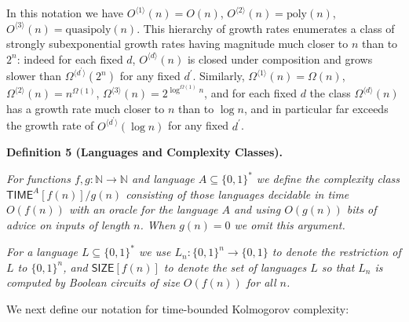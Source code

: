 


In this notation we have $O^{\langle 1\rangle}(n)=O(n)$, $O^{\langle 2\rangle}(n)=\mathrm{poly}(n)$, $O^{\langle 3\rangle}(n)=\mathrm{quasipoly}(n)$. This hierarchy of growth rates enumerates a class of strongly subexponential growth rates having magnitude much closer to $n$ than to $2^{n}$: indeed for each fixed $d$, $O^{\langle d\rangle}(n)$ is closed under composition and grows slower than $\Omega^{\langle d^{\prime}\rangle}(2^{n})$ for any fixed $d^{\prime}$.
Similarly, $\Omega^{\langle 1\rangle}(n)=\Omega(n)$, $\Omega^{\langle 2\rangle}(n)=n^{\Omega(1)}$, $\Omega^{\langle 3\rangle}(n)=2^{\log^{\Omega(1)}n}$, and for each fixed $d$ the class $\Omega^{\langle d\rangle}(n)$ has a growth rate much closer to $n$ than to $\log n$, and in particular far exceeds the growth rate of $O^{\langle d^{\prime}\rangle}(\log n)$ for any fixed $d^{\prime}$.\par





\par\medskip\noindent\textbf{
\textbf{Definition 5}\textbf{ }(Languages and Complexity Classes)\textbf{.}
}\par



\emph{For functions $f,g:\mathbb{N}\to\mathbb{N}$ and language $A\subseteq\{0,1\}^{*}$ we define the complexity class ${\mathsf{TIME}}^{A}[f(n)]/g(n)$ consisting of those languages decidable in time $O(f(n))$ with an oracle for the language $A$ and using $O(g(n))$ bits of advice on inputs of length $n$. When $g(n)=0$ we omit this argument.}\par




\emph{For a language $L\subseteq\{0,1\}^{*}$ we use $L_{n}:\{0,1\}^{n}\to\{0,1\}$ to denote the restriction of $L$ to $\{0,1\}^{n}$, and ${\mathsf{SIZE}}[f(n)]$ to denote the set of languages $L$ so that $L_{n}$ is computed by Boolean circuits of size $O(f(n))$ for all $n$.}\par






We next define our notation for time-bounded Kolmogorov complexity:\par



